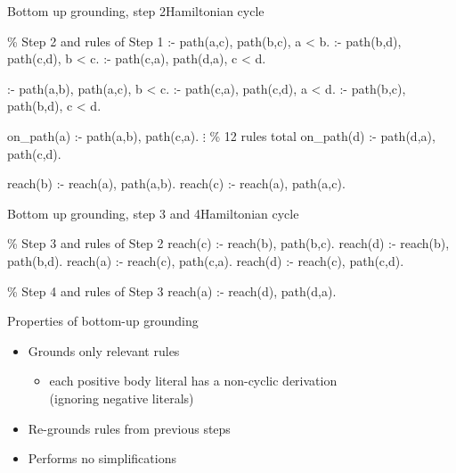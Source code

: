 \begin{frame}{Bottom up grounding, step 2}{Hamiltonian cycle}
\begin{SemiVerbatim}[\small]{.9}
{\color{comment}\% Step 2 \alert{and} rules of Step 1}
:- \alert{path(a,c)}, \alert{path(b,c)}, a < b.
:- \alert{path(b,d)}, \alert{path(c,d)}, b < c.
:- \alert{path(c,a)}, \alert{path(d,a)}, c < d.

:- \alert{path(a,b)}, \alert{path(a,c)}, b < c.
:- \alert{path(c,a)}, \alert{path(c,d)}, a < d.
:- \alert{path(b,c)}, \alert{path(b,d)}, c < d.

on_path(a) :- \alert{path(a,b)}, \alert{path(c,a)}.
           \(\vdots\) {\color{comment}\% 12 rules total}
on_path(d) :- \alert{path(d,a)}, \alert{path(c,d)}.

reach(b) :- \alert{reach(a)}, \alert{path(a,b)}.
reach(c) :- \alert{reach(a)}, \alert{path(a,c)}.
\end{SemiVerbatim}
\end{frame}
\begin{frame}{Bottom up grounding, step 3 and 4}{Hamiltonian cycle}
  \bigskip
\begin{SemiVerbatim}{.9}
{\color{comment}\% Step 3 \alert{and} rules of Step 2}
reach(c) :- \alert{reach(b)}, path(b,c).
reach(d) :- \alert{reach(b)}, path(b,d).
reach(a) :- \alert{reach(c)}, path(c,a).
reach(d) :- \alert{reach(c)}, path(c,d).

{\color{comment}\% Step 4 \alert{and} rules of Step 3}
reach(a) :- \alert{reach(d)}, path(d,a).
\end{SemiVerbatim}
\end{frame}
\begin{frame}{Properties of bottom-up grounding}
  \bigskip
  \begin{itemize}
  \item Grounds only \alert{relevant} rules
    \begin{itemize}\normalsize
    \item each positive body literal has a non-cyclic derivation \\
      (ignoring negative literals)
    \end{itemize}
    \smallskip
  \item \alert{Re-grounds} rules from previous steps
    \medskip
  \item Performs no \alert{simplifications}
  \end{itemize}
\end{frame}
